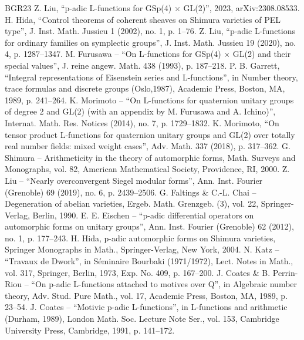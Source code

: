 \documentclass[10pt]{amsart}
\theoremstyle{plain}
\theoremstyle{remark}
\begin{document}
\begin{thebibliography}{BGR23}
 Z. Liu, “p-adic L-functions for GSp(4) × GL(2)”, 2023, arXiv:2308.08533.
 H. Hida, “Control theorems of coherent sheaves on Shimura varieties of PEL type”, J. Inst. Math. Jussieu 1 (2002), no. 1, p. 1–76.
 Z. Liu, “p-adic L-functions for ordinary families on symplectic groups”, J. Inst. Math. Jussieu 19 (2020), no. 4, p. 1287–1347.
 M. Furusawa – “On L-functions for GSp(4) × GL(2) and their special values”, J. reine angew. Math. 438 (1993), p. 187–218.
 P. B. Garrett, “Integral representations of Eisenstein series and L-functions”, in Number theory, trace formulas and discrete groups (Oslo,1987), Academic Press, Boston, MA, 1989, p. 241–264.
 K. Morimoto – “On L-functions for quaternion unitary groups of degree 2 and GL(2) (with an appendix by M. Furusawa and A. Ichino)”, Internat. Math. Res. Notices (2014), no. 7, p. 1729–1832.
 K. Morimoto, “On tensor product L-functions for quaternion unitary groups and GL(2) over totally real number fields: mixed weight cases”, Adv. Math. 337 (2018), p. 317–362.
 G. Shimura – Arithmeticity in the theory of automorphic forms, Math. Surveys and Monographs, vol. 82, American Mathematical Society, Providence, RI, 2000.
 Z. Liu – “Nearly overconvergent Siegel modular forms”, Ann. Inst. Fourier (Grenoble) 69 (2019), no. 6, p. 2439–2506.
 G. Faltings \& C.-L. Chai – Degeneration of abelian varieties, Ergeb. Math. Grenzgeb. (3), vol. 22, Springer-Verlag, Berlin, 1990.
 E. E. Eischen – “p-adic differential operators on automorphic forms on unitary groups”, Ann. Inst. Fourier (Grenoble) 62 (2012), no. 1, p. 177–243.
 H. Hida, p-adic automorphic forms on Shimura varieties, Springer Monographs in Math., Springer-Verlag, New York, 2004.
 N. Katz – “Travaux de Dwork”, in Séminaire Bourbaki (1971/1972), Lect. Notes in Math., vol. 317, Springer, Berlin, 1973, Exp. No. 409, p. 167–200.
 J. Coates \& B. Perrin-Riou – “On p-adic L-functions attached to motives over Q”, in Algebraic number theory, Adv. Stud. Pure Math., vol. 17, Academic Press, Boston, MA, 1989, p. 23–54.
 J. Coates – “Motivic p-adic L-functions”, in L-functions and arithmetic (Durham, 1989), London Math. Soc. Lecture Note Ser., vol. 153, Cambridge University Press, Cambridge, 1991, p. 141–172.

\end{thebibliography}
\end{document}

